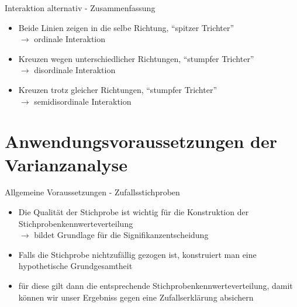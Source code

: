 \documentclass{beamer}
\begin{document}
	\begin{frame}{Interaktion alternativ - Zusammenfassung}
		\begin{itemize}
			\item Beide Linien zeigen in die selbe Richtung, ``spitzer Trichter''\\
			$\rightarrow$ ordinale Interaktion
			\item Kreuzen wegen unterschiedlicher Richtungen, ``stumpfer Trichter''\\
			$\rightarrow$ disordinale Interaktion
			\item Kreuzen trotz gleicher Richtungen, ``stumpfer Trichter''\\
			$\rightarrow$ semidisordinale Interaktion
		\end{itemize}
	\end{frame}
	
	\section{Anwendungsvoraussetzungen der Varianzanalyse}
	
	\begin{frame}{Allgemeine Voraussetzungen - Zufallsstichproben}
		\begin{itemize}
			\item Die Qualität der Stichprobe ist wichtig für die Konstruktion der Stichprobenkennwerteverteilung  \\
			 $\rightarrow$ bildet Grundlage für die Signifikanzentscheidung
			\item Falls die Stichprobe nichtzufällig gezogen ist, konstruiert man eine hypothetische Grundgesamtheit 
			\item für diese gilt dann die entsprechende Stichprobenkennwerteverteilung, damit können wir unser Ergebniss gegen eine Zufallserklärung absichern
		\end{itemize}
	\end{frame}
	
\end{document}
